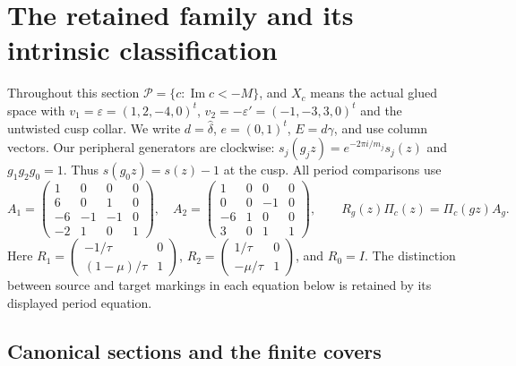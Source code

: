 \section{The retained family and its intrinsic classification}\label{fam:section:A}

Throughout this section $\mathcal P=\{c:\operatorname{Im}c<-M\}$, and $X_c$ means the actual glued space with $v_1=\varepsilon=(1,2,-4,0)^t$, $v_2=-\varepsilon'=(-1,-3,3,0)^t$ and the untwisted cusp collar. We write $d=\widehat\delta$, $e=(0,1)^t$, $E=d\gamma$, and use column vectors. Our peripheral generators are clockwise: $s_j(g_jz)=e^{-2\pi i/m_j}s_j(z)$ and $g_1g_2g_0=1$. Thus $s(g_0z)=s(z)-1$ at the cusp. All period comparisons use
\[
 A_1=\begin{pmatrix}1&0&0&0\\6&0&1&0\\-6&-1&-1&0\\-2&1&0&1\end{pmatrix},\quad
 A_2=\begin{pmatrix}1&0&0&0\\0&0&-1&0\\-6&1&0&0\\3&0&1&1\end{pmatrix},\qquad
 R_g(z)\Pi_c(z)=\Pi_c(gz)A_g.
\]
Here $R_1=\left(\begin{smallmatrix}-1/\tau&0\\(1-\mu)/\tau&1\end{smallmatrix}\right)$, $R_2=\left(\begin{smallmatrix}1/\tau&0\\-\mu/\tau&1\end{smallmatrix}\right)$, and $R_0=I$. The distinction between source and target markings in each equation below is retained by its displayed period equation.

\subsection{Canonical sections and the finite covers}\label{fam:section:A.1}

